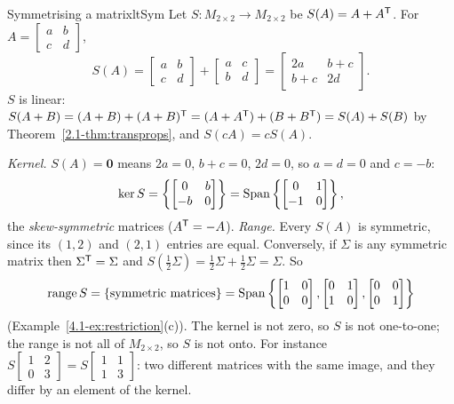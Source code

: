 \documentclass[11pt]{article}
\begin{document}
\begin{exmp}{Symmetrising a matrix}{ltSym}
Let $S:M_{2\times2}\to M_{2\times2}$ be $S(A)=A+A^{\mathsf T}$. For $A=\begin{bmatrix}a&b\\c&d\end{bmatrix}$,
\[
S(A)=\begin{bmatrix}a&b\\c&d\end{bmatrix}+\begin{bmatrix}a&c\\b&d\end{bmatrix}=\begin{bmatrix}2a&b+c\\b+c&2d\end{bmatrix}.
\]
$S$ is linear: $S(A+B)=(A+B)+(A+B)^{\mathsf T}=(A+A^{\mathsf T})+(B+B^{\mathsf T})=S(A)+S(B)$ by Theorem~\ref{2.1-thm:transprops}, and $S(cA)=cS(A)$.

\emph{Kernel.} $S(A)=\mathbf{0}$ means $2a=0$, $b+c=0$, $2d=0$, so $a=d=0$ and $c=-b$:
\[
\ker S=\left\{\begin{bmatrix}0&b\\-b&0\end{bmatrix}\right\}=\operatorname{Span}\left\{\begin{bmatrix}0&1\\-1&0\end{bmatrix}\right\},
\]
the \emph{skew-symmetric} matrices ($A^{\mathsf T}=-A$). \emph{Range.} Every $S(A)$ is symmetric, since its $(1,2)$ and $(2,1)$ entries are equal. Conversely, if $\Sigma$ is any symmetric matrix then $\Sigma^{\mathsf T}=\Sigma$ and $S(\tfrac12\Sigma)=\tfrac12\Sigma+\tfrac12\Sigma=\Sigma$. So
\[
\operatorname{range}S=\{\text{symmetric matrices}\}=\operatorname{Span}\left\{\begin{bmatrix}1&0\\0&0\end{bmatrix},\begin{bmatrix}0&1\\1&0\end{bmatrix},\begin{bmatrix}0&0\\0&1\end{bmatrix}\right\}
\]
(Example~\ref{4.1-ex:restriction}(c)). The kernel is not zero, so $S$ is not one-to-one; the range is not all of $M_{2\times2}$, so $S$ is not onto. For instance $S\begin{bmatrix}1&2\\0&3\end{bmatrix}=S\begin{bmatrix}1&1\\1&3\end{bmatrix}$: two different matrices with the same image, and they differ by an element of the kernel.
\end{exmp}
\end{document}
